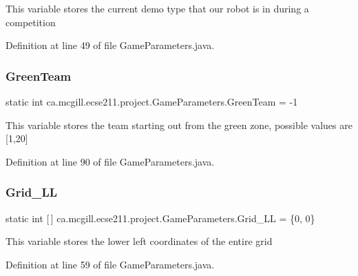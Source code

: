 This variable stores the current demo type that our robot is in during a competition 

Definition at line 49 of file Game\+Parameters.\+java.

\mbox{\label{enumca_1_1mcgill_1_1ecse211_1_1project_1_1_game_parameters_a1d6292807667d219edc172574c2aedbc}} 
\subsubsection{\texorpdfstring{Green\+Team}{GreenTeam}}
{\footnotesize\ttfamily  static  int ca.\+mcgill.\+ecse211.\+project.\+Game\+Parameters.\+Green\+Team = -\/1\hspace{0.3cm}{\ttfamily [static]}}

This variable stores the team starting out from the green zone, possible values are \mbox{[}1,20\mbox{]} 

Definition at line 90 of file Game\+Parameters.\+java.

\mbox{\label{enumca_1_1mcgill_1_1ecse211_1_1project_1_1_game_parameters_ab190471dbd9bb10d8cef92c1b8bea826}} 
\subsubsection{\texorpdfstring{Grid\+\_\+\+LL}{Grid\_LL}}
{\footnotesize\ttfamily  static  int \mbox{[}$\,$\mbox{]} ca.\+mcgill.\+ecse211.\+project.\+Game\+Parameters.\+Grid\+\_\+\+LL = \{0, 0\}\hspace{0.3cm}{\ttfamily [static]}}

This variable stores the lower left coordinates of the entire grid 

Definition at line 59 of file Game\+Parameters.\+java.


